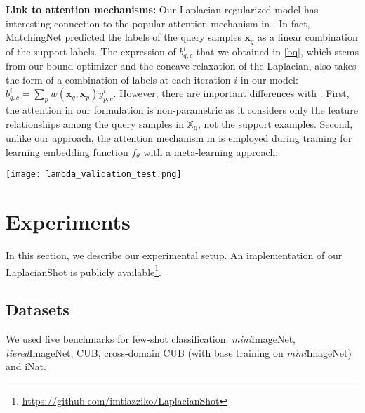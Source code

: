 \documentclass{article}
\newcommand{\ftheta}{f_{\theta}}
\newcommand{\xxq}{\mathbf{x}}
\newcommand{\XXq}{\mathbb{X}_{\text{q}}}
\begin{document}
\textbf{Link to attention mechanisms:} Our Laplacian-regularized model has interesting connection to the popular attention mechanism in \cite{Vaswani17}. In fact, MatchingNet \cite{Vinyals2016MatchingNF} predicted the labels of the query samples $\xxq_q$ as a linear combination of the support labels. The expression of $b_{q,c}^i$ that we obtained in \eqref{bq}, which stems from our bound optimizer and the concave relaxation of the Laplacian, also takes the form of a combination of labels at each iteration $i$ in our model: $b_{q,c}^i =   \sum_{p} w (\xxq_q, \xxq_p) y_{p,c}^i$. However, there are
important differences with \cite{Vinyals2016MatchingNF}: First, the attention in our formulation is non-parametric as it considers only the feature relationships among the query samples in $\XXq$, not the support examples. Second, unlike our approach, the attention mechanism in \cite{Vinyals2016MatchingNF} is employed during training for learning embedding function $\ftheta$ with a meta-learning approach.
\begin{figure*}
\vskip 0.1in
\begin{center}
\texttt{[image: lambda\_validation\_test.png]}
\caption{ We tune regularization parameter $\lambda$ over values ranging from 0.1 to 1.5. In the above plots, we show the impact of choosing $\lambda$ on both validation and test accuracies. The values of $\lambda$ based on the best validation accuracies correspond to good accuracies in the test classes. The results are shown for different networks on \textit{mini}ImageNet dataset, for both 1-shot (top row) and 5-shot (bottom row).}
\label{fig:lambda}
\end{center}
\vskip -0.2in
\end{figure*}
\section{Experiments}
In this section, we describe our experimental setup. An implementation of our LaplacianShot is publicly available\footnote{\hyperlink{https://github.com/imtiazziko/LaplacianShot}{https://github.com/imtiazziko/LaplacianShot}}.
\subsection{Datasets}
We used five benchmarks for few-shot classification: 
\textit{mini}ImageNet, \textit{tiered}ImageNet, CUB, cross-domain CUB (with base training on \textit{mini}ImageNet) and iNat.
\end{document}
